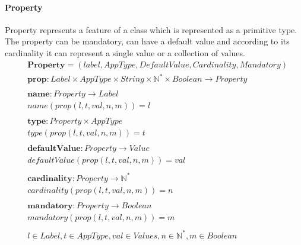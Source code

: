 \documentclass[11pt]{article}
\begin{document}
\paragraph{Property} Property represents a feature of a class which is represented as a primitive type. The property can be mandatory, can have a default value and according to its cardinality it can represent a single value or a collection of values. 
\begin{align*}
&	\mathbf{Property} = (label, AppType, DefaultValue, Cardinality, Mandatory) \\
&	\mathbf{prop} : Label \times AppType \times String \times \mathbb{N^{*}} \times Boolean \rightarrow Property \\ \\
&	\mathbf{name} : Property \rightarrow Label \\
&	name(prop(l, t, val, n, m)) = l \\ \\
&	\mathbf{type} : Property \times AppType \\
&	type(prop(l, t, val, n, m)) = t \\ \\
&	\mathbf{defaultValue} : Property \rightarrow Value \\
&	defaultValue(prop(l, t, val, n, m)) = val \\ \\
&	\mathbf{cardinality} : Property \rightarrow \mathbb{N^{*}} \\
&	cardinality(prop(l, t, val, n, m)) = n \\ \\
&	\mathbf{mandatory} : Property \rightarrow Boolean \\
&	mandatory(prop(l, t, val, n, m)) = m  \\ \\
&	l \in Label, t \in AppType, val \in Values, n \in \mathbb{N^{*}}, m \in Boolean 
\end{align*}
\end{document}
